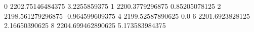 0 2202.75146484375 3.2255859375
1 2200.3779296875 0.85205078125
2 2198.561279296875 -0.964599609375
4 2199.52587890625 0.0
6 2201.6923828125 2.16650390625
8 2204.699462890625 5.173583984375
